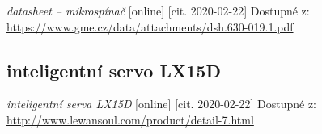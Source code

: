 \documentclass{template/socthesis}
\begin{document}
\begin{thebibliography}{1}
			
			\textit{datasheet -- mikrospínač} [online] [cit. 2020-02-22] Dostupné z:
			\url{https://www.gme.cz/data/attachments/dsh.630-019.1.pdf}
			
			\subsection*{inteligentní servo LX15D}
			
			\textit{inteligentní serva LX15D} [online] [cit. 2020-02-22] Dostupné z:
			\url{http://www.lewansoul.com/product/detail-7.html}
			
		\end{thebibliography}
\end{document}
